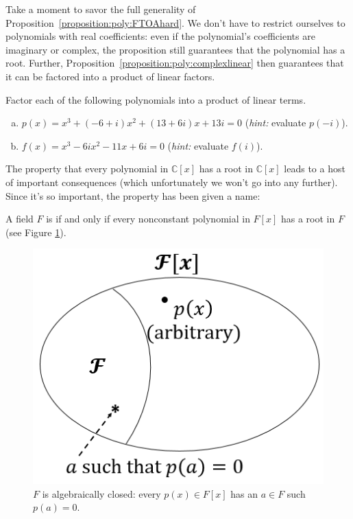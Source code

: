 Take a moment to savor the full generality of Proposition~\ref{proposition:poly:FTOAhard}. We don't have to restrict ourselves to polynomials with real coefficients: even if the polynomial's coefficients are imaginary or complex, the proposition still guarantees that the polynomial has a root. Further, Proposition~\ref{proposition:poly:complexlinear} then guarantees that it can be factored into a product of linear factors.

\begin{exercise}{}
Factor each of the following polynomials into a product of linear terms.
\begin{enumerate}[(a)]
\item
$p(x) = x^3 + (-6+i)x^2 + (13+6i)x + 13i = 0$  (\emph{hint:} evaluate $p(-i)$).
\item
$f(x) = x^3 - 6ix^2 -11x + 6i = 0$ (\emph{hint:} evaluate $f(i)$).
\end{enumerate}
\end{exercise}

The property that every polynomial in $\mathbb{C}[x]$ has a root in $\mathbb{C}[x]$ leads to a host of important consequences (which unfortunately we won't go into any further). Since it's so important, the property has been given a name:

\begin{defn}\label{def:algclosed}  
A field $F$ is  if and only if every nonconstant polynomial in $F[x]$ has a root in $F$ (see Figure \ref{algebraicallyclosed}).
\end{defn}

\begin{figure}
\begin{center}
\includegraphics[scale=0.35]{images/algebraically_closed.png}
\caption{$F$ is algebraically closed: every $p(x)\in F[x]$ has an $a\in F$ such  $p(a)=0$.}\label{algebraicallyclosed}
\end{center}
\end{figure}

